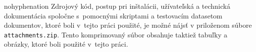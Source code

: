
\listoffigures
\listoftables
\ifEN
{}
\else
{}
\fi
\begin{hyphenrules}{nohyphenation}
Zdrojový kód, postup pri inštalácii, užívateľská a technická dokumentácia spoločne s~pomocnými skriptami a testovacím datasetom dokumentov, ktoré boli v~tejto práci použité, je možné nájsť v priloženom súbore \texttt{attachments.zip}. Tento komprimovaný súbor obsahuje taktiež tabuľky a obrázky, ktoré boli použité v~tejto práci.
\end{hyphenrules}
\renewcommand{\thesection}{\Alph{section}}
